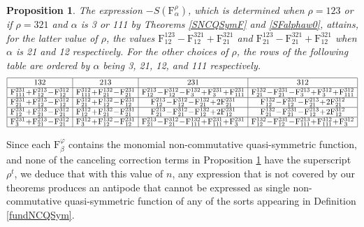 \documentclass{article}
\newtheorem{prop}[thm]{Proposition}
\theoremstyle{definition}
\begin{document}
\begin{prop}
The expression $-S(\mathrm{F}_{\alpha}^{\rho})$, which is determined when $\rho=123$ or if $\rho=321$ and $\alpha$ is 3 or 111 by Theorems \ref{SNCQSymF} and \ref{SFalphaw0}, attains, for the latter value of $\rho$, the values $\mathrm{F}_{12}^{123}-\mathrm{F}_{12}^{321}+\mathrm{F}_{21}^{321}$ and $\mathrm{F}_{21}^{123}-\mathrm{F}_{21}^{321}+\mathrm{F}_{12}^{321}$ when $\alpha$ is 21 and 12 respectively. For the other choices of $\rho$, the rows of the following table are ordered by $\alpha$ being 3, 21, 12, and 111 respectively. \[\begin{tabular}{|c|c|c|c|} \hline $132$ & $213$ & $231$ & $312$ \\ \hline $\!\mathrm{F}_{111}^{231}\!+\!\mathrm{F}_{12}^{213}\!-\!\mathrm{F}_{12}^{312}\!$ & $\!\mathrm{F}_{111}^{312}\!+\!\mathrm{F}_{21}^{132}\!-\!\mathrm{F}_{21}^{231}\!$ & $\!\mathrm{F}_{12}^{213}\!-\!\mathrm{F}_{12}^{312}\!-\!\mathrm{F}_{3}^{132}\!+\!\mathrm{F}_{3}^{231}\!+\!\mathrm{F}_{111}^{231}\!$ & $\!\mathrm{F}_{21}^{132}\!-\!\mathrm{F}_{21}^{231}\!-\!\mathrm{F}_{3}^{213}\!+\!\mathrm{F}_{3}^{312}\!+\!\mathrm{F}_{111}^{312}\!$ \\ \hline $\!\mathrm{F}_{21}^{231}\!+\!\mathrm{F}_{12}^{213}\!-\!\mathrm{F}_{12}^{312}\!$ & $\!\mathrm{F}_{21}^{312}\!+\!\mathrm{F}_{12}^{132}\!-\!\mathrm{F}_{12}^{231}\!$ & $\!\mathrm{F}_{12}^{213}\!-\!\mathrm{F}_{12}^{312}\!-\!\mathrm{F}_{21}^{132}\!+\!2\mathrm{F}_{21}^{231}\!$ & $\!\mathrm{F}_{12}^{132}\!-\!\mathrm{F}_{12}^{231}\!-\!\mathrm{F}_{21}^{213}\!+\!2\mathrm{F}_{21}^{312}\!$ \\ \hline $\!\mathrm{F}_{12}^{231}\!+\!\mathrm{F}_{21}^{213}\!-\!\mathrm{F}_{21}^{312}\!$ & $\!\mathrm{F}_{12}^{312}\!+\!\mathrm{F}_{21}^{132}\!-\!\mathrm{F}_{21}^{231}\!$ & $\!\mathrm{F}_{21}^{213}\!-\!\mathrm{F}_{21}^{312}\!-\!\mathrm{F}_{12}^{132}\!+\!2\mathrm{F}_{12}^{231}\!$ & $\!\mathrm{F}_{21}^{132}\!-\!\mathrm{F}_{21}^{231}\!-\!\mathrm{F}_{12}^{213}\!+\!2\mathrm{F}_{12}^{312}\!$ \\ \hline $\!\mathrm{F}_{3}^{231}\!+\!\mathrm{F}_{21}^{213}\!-\!\mathrm{F}_{21}^{312}\!$ & $\!\mathrm{F}_{3}^{312}\!+\!\mathrm{F}_{12}^{132}\!-\!\mathrm{F}_{12}^{231}\!$ & $\!\mathrm{F}_{21}^{213}\!-\!\mathrm{F}_{21}^{312}\!-\!\mathrm{F}_{111}^{132}\!+\!\mathrm{F}_{111}^{231}\!+\!\mathrm{F}_{3}^{231}\!$ & $\!\mathrm{F}_{12}^{132}\!-\!\mathrm{F}_{12}^{231}\!-\!\mathrm{F}_{111}^{213}\!+\!\mathrm{F}_{111}^{312}\!+\!\mathrm{F}_{3}^{312}\!$ \\ \hline \end{tabular}\]
\label{antipode3}
\end{prop}
Since each $\mathrm{F}_{\beta}^{\varphi}$ contains the monomial non-commutative quasi-symmetric function, and none of the canceling correction terms in Proposition \ref{antipode3} have the superscript $\rho^{t}$, we deduce that with this value of $n$, any expression that is not covered by our theorems produces an antipode that cannot be expressed as single non-commutative quasi-symmetric function of any of the sorts appearing in Definition \ref{fundNCQSym}.
\end{document}

